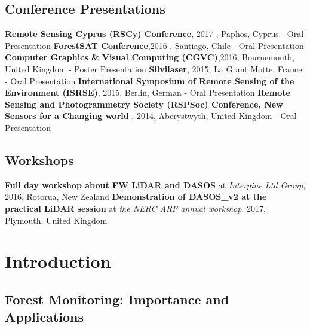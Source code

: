 \documentclass[11pt,nofootinbib]{report}
\begin{document}
	
	\section{Conference Presentations}
	    \textbf{Remote Sensing Cyprus (RSCy) Conference},  2017 , Paphos, Cyprus - Oral Presentation \newline
		\textbf{ForestSAT Conference},2016 , Santiago, Chile - Oral Presentation \newline
		\textbf{Computer Graphics \& Visual Computing (CGVC)},2016, Bournemouth, United Kingdom - Poster Presentation \newline
		\textbf{Silvilaser}, 2015, La Grant Motte, France - Oral Presentation \newline
		\textbf{International Symposium of Remote Sensing of the Environment 	(ISRSE)}, 2015, Berlin, German - Oral Presentation\newline
		\textbf{Remote Sensing and Photogrammetry Society (RSPSoc) Conference, New Sensors for a Changing world} , 2014, Aberystwyth, United Kingdom - Oral Presentation \newline
	
	 
	\section{Workshops}
		\textbf{Full day workshop about FW LiDAR and DASOS} at \textit{Interpine Ltd Group}, 2016, Rotorua, New Zealand \newline
		\textbf{Demonstration of DASOS\_v2 at the practical LiDAR session} at \textit{ the NERC ARF annual workshop}, 2017, Plymouth, United Kingdom \newline


	\setcounter{secnumdepth}{1}
   	\setcounter{tocdepth}{1}
    \tableofcontents	 

		\newpage  
	\cleardoublepage
	
	
		
		
	\setcounter{secnumdepth}{4}		

	\chapter{Introduction} \label{Introduction} 	
		\section{Forest Monitoring: Importance and Applications}\label{sec:forestMonitoring}
		
\end{document}
